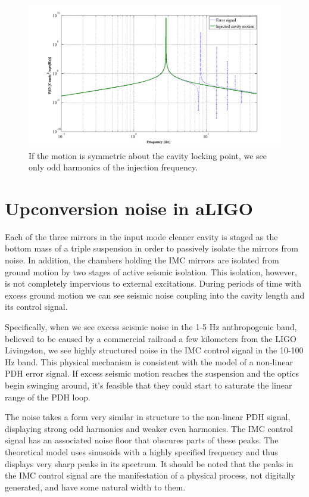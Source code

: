 \begin{figure}[h!]
\includegraphics[height=0.6\textwidth]{figures/IMCUpconversion/symmetric_PDH.png}
\caption[PDH response to symmetric cavity motion]{If the motion is symmetric about the cavity locking point, we see only odd harmonics of the injection frequency.}
\label{fig:symmetric-pdh}
\end{figure}

\section{Upconversion noise in aLIGO}
Each of the three mirrors in the input mode cleaner cavity is staged as the bottom 
mass of a triple suspension in order to passively isolate the mirrors from noise. 
In addition, the chambers holding the IMC mirrors are isolated from ground motion by 
two stages of active seismic isolation. This isolation, however, is not completely 
impervious to external excitations. During periods of time with excess ground motion 
we can see seismic noise coupling into the cavity length and its control signal.

Specifically, when we see excess seismic noise in the 1-5 Hz anthropogenic band, 
believed to be caused by a commercial railroad a few kilometers from the LIGO 
Livingston, we see highly structured noise in the IMC control signal in the 10-100 Hz 
band. This physical mechanism is consistent with the model of a non-linear PDH error 
signal. If excess seismic motion reaches the suspension and the optics begin swinging 
around, it's feasible that they could start to saturate the linear range of the PDH loop.

The noise takes a form very similar in structure to the non-linear PDH signal, displaying 
strong odd harmonics and weaker even harmonics. The IMC control signal has an associated 
noise floor that obscures parts of these peaks. The theoretical model uses sinusoids with 
a highly specified frequency and thus displays very sharp peaks in its spectrum. 
It should be noted that the peaks in the IMC control signal are the manifestation of 
a physical process, not digitally generated, and have some natural width to them.

